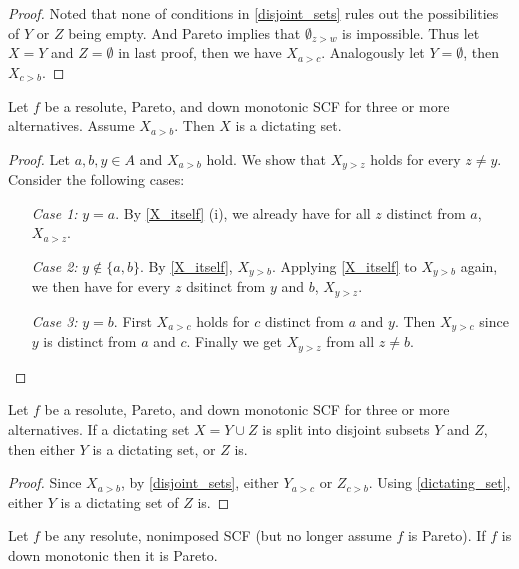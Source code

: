 \begin{proof}
    Noted that none of conditions in \cref{disjoint_sets} rules out the possibilities of $Y$ or $Z$ being empty. And Pareto implies that $\emptyset_{z>w}$ is impossible. Thus let $X = Y$ and $Z = \emptyset$ in last proof, then we have $X_{a>c}$. Analogously let $Y = \emptyset$, then $X_{c>b}$.
\end{proof}

\begin{lemma}
    \label{dictating_set}
    Let $f$ be a resolute, Pareto, and down monotonic SCF for three or more alternatives. Assume $X_{a>b}$. Then $X$ is a dictating set.
\end{lemma}

\begin{proof}
    Let $a,b,y\in A$ and $X_{a>b}$ hold. We show that $X_{y>z}$ holds for every $z \neq y$. Consider the following cases:
    \begin{itemize}
        \item[\textit{Case 1:}] $y = a$. By \cref{X_itself} (i), we already have for all $z$ distinct from $a$, $X_{a>z}$.
        \item[\textit{Case 2:}] $y \not \in \{a,b\}$. By \cref{X_itself}, $X_{y>b}$. Applying \cref{X_itself} to $X_{y>b}$ again, we then have for every $z$ dsitinct from $y$ and $b$, $X_{y>z}$.
        \item[\textit{Case 3:}] $y = b$. First $X_{a>c}$ holds for $c$ distinct from $a$ and $y$. Then $X_{y>c}$ since $y$ is distinct from $a$ and $c$. Finally we get $X_{y>z}$ from all $z \neq b$.
    \end{itemize}
\end{proof}

\begin{lemma}
    \label{splitting_lemma}
    Let $f$ be a resolute, Pareto, and down monotonic SCF for three or more alternatives. If a dictating set $X = Y \cup Z$ is split into disjoint subsets $Y$ and $Z$, then either $Y$ is a dictating set, or $Z$ is.
\end{lemma}

\begin{proof}
    Since $X_{a>b}$, by \cref{disjoint_sets}, either $Y_{a>c}$ or $Z_{c>b}$. Using \cref{dictating_set}, either $Y$ is a dictating set of $Z$ is.
\end{proof}

\begin{lemma}
    \label{Adjustment_lemma}
    Let $f$ be any resolute, nonimposed SCF (but no longer assume $f$ is Pareto). If $f$ is down monotonic then it is Pareto.
\end{lemma}

